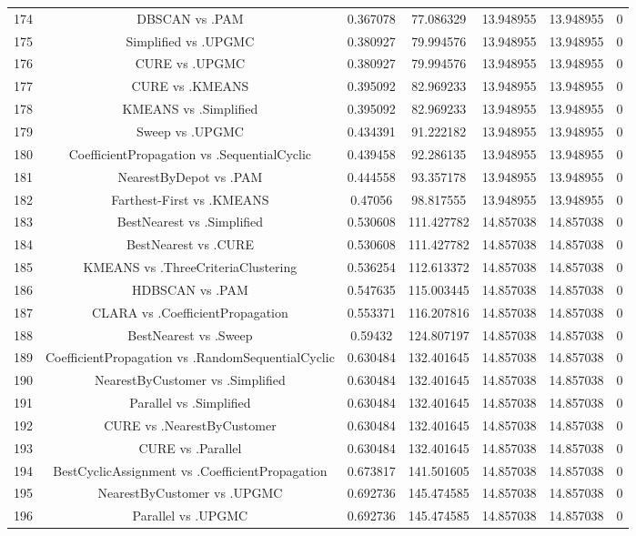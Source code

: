 \documentclass[a4paper,10pt]{article}
\begin{document}
\begin{landscape}
\begin{table}[!htp]
\begin{tabular}{ccccccc}
174&DBSCAN vs .PAM&0.367078&77.086329&13.948955&13.948955&0\\
175&Simplified vs .UPGMC&0.380927&79.994576&13.948955&13.948955&0\\
176&CURE vs .UPGMC&0.380927&79.994576&13.948955&13.948955&0\\
177&CURE vs .KMEANS&0.395092&82.969233&13.948955&13.948955&0\\
178&KMEANS vs .Simplified&0.395092&82.969233&13.948955&13.948955&0\\
179&Sweep vs .UPGMC&0.434391&91.222182&13.948955&13.948955&0\\
180&CoefficientPropagation vs .SequentialCyclic&0.439458&92.286135&13.948955&13.948955&0\\
181&NearestByDepot vs .PAM&0.444558&93.357178&13.948955&13.948955&0\\
182&Farthest-First vs .KMEANS&0.47056&98.817555&13.948955&13.948955&0\\
183&BestNearest vs .Simplified&0.530608&111.427782&14.857038&14.857038&0\\
184&BestNearest vs .CURE&0.530608&111.427782&14.857038&14.857038&0\\
185&KMEANS vs .ThreeCriteriaClustering&0.536254&112.613372&14.857038&14.857038&0\\
186&HDBSCAN vs .PAM&0.547635&115.003445&14.857038&14.857038&0\\
187&CLARA vs .CoefficientPropagation&0.553371&116.207816&14.857038&14.857038&0\\
188&BestNearest vs .Sweep&0.59432&124.807197&14.857038&14.857038&0\\
189&CoefficientPropagation vs .RandomSequentialCyclic&0.630484&132.401645&14.857038&14.857038&0\\
190&NearestByCustomer vs .Simplified&0.630484&132.401645&14.857038&14.857038&0\\
191&Parallel vs .Simplified&0.630484&132.401645&14.857038&14.857038&0\\
192&CURE vs .NearestByCustomer&0.630484&132.401645&14.857038&14.857038&0\\
193&CURE vs .Parallel&0.630484&132.401645&14.857038&14.857038&0\\
194&BestCyclicAssignment vs .CoefficientPropagation&0.673817&141.501605&14.857038&14.857038&0\\
195&NearestByCustomer vs .UPGMC&0.692736&145.474585&14.857038&14.857038&0\\
196&Parallel vs .UPGMC&0.692736&145.474585&14.857038&14.857038&0\\

\end{tabular}
\end{table}
\end{landscape}
\end{document}
